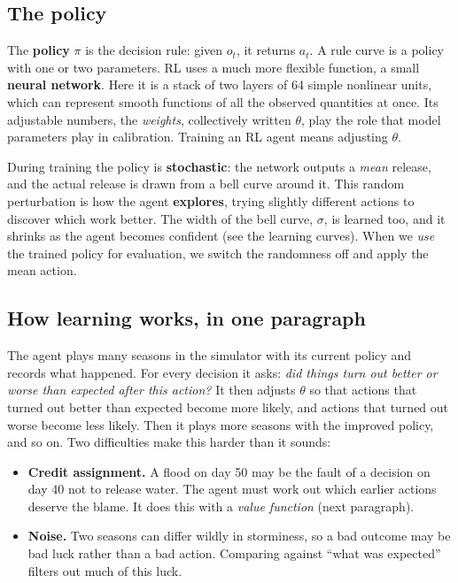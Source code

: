 \subsection{The policy}
The \textbf{policy} $\pi$ is the decision rule: given $o_t$, it returns
$a_t$. A rule curve is a policy with one or two parameters. RL uses a much
more flexible function, a small \textbf{neural network}. Here it is a stack
of two layers of 64 simple nonlinear units, which can represent smooth
functions of all the observed quantities at once. Its adjustable numbers,
the \emph{weights}, collectively written $\theta$, play the role that model
parameters play in calibration. Training an RL agent means adjusting
$\theta$.

During training the policy is \textbf{stochastic}: the network outputs a
\emph{mean} release, and the actual release is drawn from a bell curve
around it. This random perturbation is how the agent \textbf{explores},
trying slightly different actions to discover which work better. The
width of the bell curve, $\sigma$, is learned too, and it shrinks as the
agent becomes confident (see the learning curves). When we \emph{use} the
trained policy for evaluation, we switch the randomness off and apply the
mean action.

\subsection{How learning works, in one paragraph}
The agent plays many seasons in the simulator with its current policy and
records what happened. For every decision it asks: \emph{did things turn
out better or worse than expected after this action?} It then adjusts
$\theta$ so that actions that turned out better than expected become more
likely, and actions that turned out worse become less likely. Then it plays
more seasons with the improved policy, and so on. Two difficulties make
this harder than it sounds:
\begin{itemize}\itemsep1pt
\item \textbf{Credit assignment.} A flood on day 50 may be the fault of a
decision on day 40 not to release water. The agent must work out which
earlier actions deserve the blame. It does this with a \emph{value
function} (next paragraph).
\item \textbf{Noise.} Two seasons can differ wildly in storminess, so a
bad outcome may be bad luck rather than a bad action. Comparing against
``what was expected'' filters out much of this luck.
\end{itemize}

